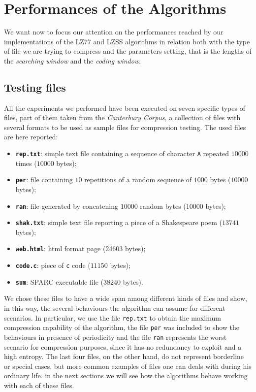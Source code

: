 \section{Performances of the Algorithms}
We want now to focus our attention on the performances reached by our implementations of the LZ77 and LZSS algorithms in relation both with the type of file we are trying to compress and the parameters setting, that is the lengths of the \textit{searching window} and the \textit{coding window}.

\subsection{Testing files}
All the experiments we performed have been executed on seven specific types of files, part of them taken from the \textit{Canterbury Corpus}, a collection of files with several formats to be used as sample files for compression testing. The used files are here reported:

\begin{itemize}
\item
\textbf{\texttt{rep.txt}}: simple text file containing a sequence of character \texttt{A} repeated $10000$ times ($10000$ bytes);

\item
\textbf{\texttt{per}}: file containing $10$ repetitions of a random sequence of $1000$ bytes ($10000$ bytes);

\item
\textbf{\texttt{ran}}: file generated by concatening $10000$ random bytes ($10000$ bytes);

\item
\textbf{\texttt{shak.txt}}: simple text file reporting a piece of a Shakespeare poem ($13741$ bytes);

\item
\textbf{\texttt{web.html}}: html format page ($24603$ bytes);

\item
\textbf{\texttt{code.c}}: piece of \texttt{c} code ($11150$ bytes);

\item
\textbf{\texttt{sum}}: SPARC executable file ($38240$ bytes).
\end{itemize}

We chose these files to have a wide span among different kinds of files and show, in this way, the several behaviours the algorithm can assume for different scenarios. In particular, we use the file \texttt{rep.txt} to obtain the maximum compression capability of the algorithm, the file \texttt{per} was included to show the behaviours in presence of periodicity and the file \texttt{ran} represents the worst scenario for compression purposes, since it has no redundancy to exploit and a high entropy. The last four files, on the other hand, do not represent borderline or special cases, but more common examples of files one can deals with during his ordinary life. in the next sections we will see how the algorithms behave working with each of these files.


